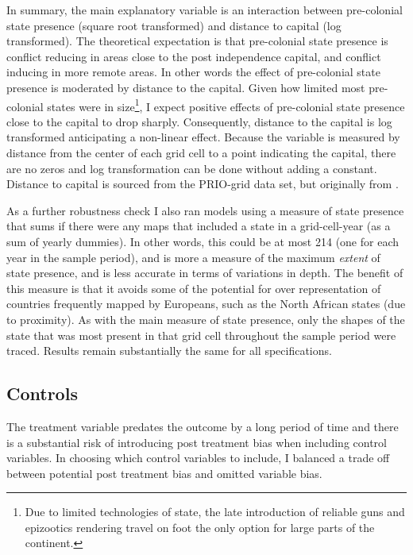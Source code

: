 \documentclass[12pt]{article}
\begin{document}
In summary, the main explanatory variable is an interaction between pre-colonial
state presence (square root transformed) and distance to capital (log
transformed). The theoretical expectation is that pre-colonial state presence is
conflict reducing in areas close to the post independence capital, and conflict
inducing in more remote areas. In other words the effect of pre-colonial state
presence is moderated by distance to the capital. Given how limited most
pre-colonial states were in size\footnote{Due to limited technologies of state,
the late introduction of reliable guns and epizootics rendering travel on foot
the only option for large parts of the continent.}, I expect positive effects of
pre-colonial state presence close to the capital to drop sharply. Consequently,
distance to the capital is log transformed anticipating a non-linear effect.
Because the variable is measured by distance from the center of each grid cell
to a point indicating the capital, there are no zeros and log transformation can
be done without adding a constant. Distance to capital is sourced from the
PRIO-grid data set, but originally from \citet{Weidmann2010a}.

As a further robustness check I also ran models using a measure of state
presence that sums if there were any maps that included a state in a
grid-cell-year (as a sum of yearly dummies). In other words, this could be at
most 214 (one for each year in the sample period), and is more a measure of the
maximum \textit{extent} of state presence, and is less accurate in terms of
variations in depth. The benefit of this measure is that it avoids some of the
potential for over representation of countries frequently mapped by Europeans,
such as the North African states (due to proximity). As with the main measure of
state presence, only the shapes of the state that was most present in that grid
cell throughout the sample period were traced. Results remain substantially the
same for all specifications.

\subsection{Controls} \label{Controls}

The treatment variable predates the outcome by a long
period of time and there is a substantial risk of introducing post treatment bias
when including control variables. In choosing which control variables to
include, I balanced a trade off between potential post treatment bias
and omitted variable bias. 
\end{document}
